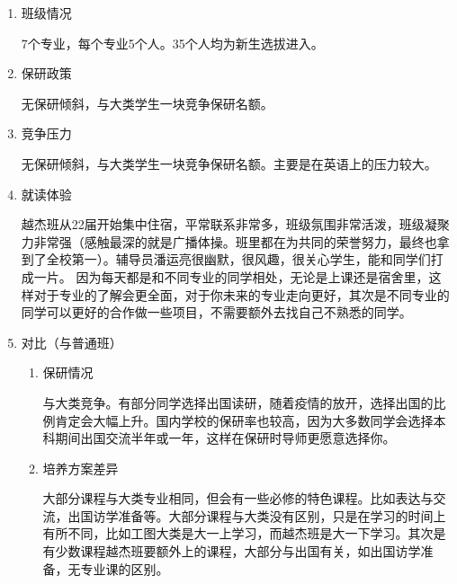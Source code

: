 \documentclass[zihao=-4,fontset=none]{Beautybook-CN}
\begin{document}
\begin{enumerate}
			
	\item 班级情况
	      	      	      
	      7个专业，每个专业5个人。35个人均为新生选拔进入。	      	      
	\item 保研政策
	      	      	      
	      无保研倾斜，与大类学生一块竞争保研名额。
	      	      	      
	\item 竞争压力
	      	      	      
	      无保研倾斜，与大类学生一块竞争保研名额。主要是在英语上的压力较大。
	\item 就读体验
	      	      	      
	      越杰班从22届开始集中住宿，平常联系非常多，班级氛围非常活泼，班级凝聚力非常强（感触最深的就是广播体操。班里都在为共同的荣誉努力，最终也拿到了全校第一）。辅导员潘运亮很幽默，很风趣，很关心学生，能和同学们打成一片。 因为每天都是和不同专业的同学相处，无论是上课还是宿舍里，这样对于专业的了解会更全面，对于你未来的专业走向更好，其次是不同专业的同学可以更好的合作做一些项目，不需要额外去找自己不熟悉的同学。
	      	      	      
	\item 对比（与普通班）
	      	      	      
	      \begin{enumerate}
	      	\item 保研情况
	      	      	      	      	      	      
	      	      与大类竞争。有部分同学选择出国读研，随着疫情的放开，选择出国的比例肯定会大幅上升。国内学校的保研率也较高，因为大多数同学会选择本科期间出国交流半年或一年，这样在保研时导师更愿意选择你。
	      	      	      	      	      	      
	      	\item 培养方案差异
	      	      	      	      	      	      
	      	      大部分课程与大类专业相同，但会有一些必修的特色课程。比如表达与交流，出国访学准备等。大部分课程与大类没有区别，只是在学习的时间上有所不同，比如工图大类是大一上学习，而越杰班是大一下学习。其次是有少数课程越杰班要额外上的课程，大部分与出国有关，如出国访学准备，无专业课的区别。
	      \end{enumerate}
\end{enumerate}
\end{document}
